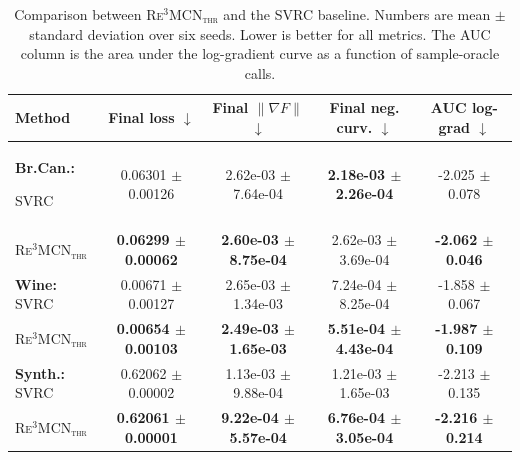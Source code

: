 \documentclass{article}
\theoremstyle{plain}
\theoremstyle{definition}
\theoremstyle{remark}
\begin{document}
\begin{table}[ht!]
\centering
\small
\setlength{\tabcolsep}{5pt}
\begin{tabular}{lcccc}
\toprule
Method & Final loss $\downarrow$ & Final $\|\nabla F\|$ $\downarrow$ & Final neg. curv. $\downarrow$ & AUC log-grad $\downarrow$ \\
\midrule
\textbf{Br.Can.:} 

SVRC & 0.06301 $\pm$ 0.00126 & 2.62e-03 $\pm$ 7.64e-04 & \textbf{2.18e-03 $\pm$ 2.26e-04} & -2.025 $\pm$ 0.078\\\textsc{Re$^3$MCN$_{\text{thr}}$} & \textbf{0.06299 $\pm$ 0.00062} & \textbf{2.60e-03 $\pm$ 8.75e-04} & 2.62e-03 $\pm$ 3.69e-04 & \textbf{-2.062 $\pm$ 0.046}\\
\midrule
\textbf{Wine:} 
SVRC & 0.00671 $\pm$ 0.00127 & 2.65e-03 $\pm$ 1.34e-03 & 7.24e-04 $\pm$ 8.25e-04 & -1.858 $\pm$ 0.067\\
\textsc{Re$^3$MCN$_{\text{thr}}$} & \textbf{0.00654 $\pm$ 0.00103} & \textbf{2.49e-03 $\pm$ 1.65e-03} & \textbf{5.51e-04 $\pm$ 4.43e-04} & \textbf{-1.987 $\pm$ 0.109}\\
\midrule
\textbf{Synth.:} 
SVRC & 0.62062 $\pm$ 0.00002 & 1.13e-03 $\pm$ 9.88e-04 & 1.21e-03 $\pm$ 1.65e-03 & -2.213 $\pm$ 0.135\\
\textsc{Re$^3$MCN$_{\text{thr}}$} & \textbf{0.62061 $\pm$ 0.00001} & \textbf{9.22e-04 $\pm$ 5.57e-04} & \textbf{6.76e-04 $\pm$ 3.05e-04} & \textbf{-2.216 $\pm$ 0.214}\\
\bottomrule
\end{tabular}
\caption{Comparison between \textsc{Re$^3$MCN$_{\text{thr}}$} and the \textsc{SVRC} baseline. Numbers are mean $\pm$ standard deviation over six seeds. Lower is better for all metrics. The AUC column is the area under the log-gradient curve as a function of sample-oracle calls.}
\label{tab:main_re3mcn_vs_svrc}
\end{table}
\end{document}
